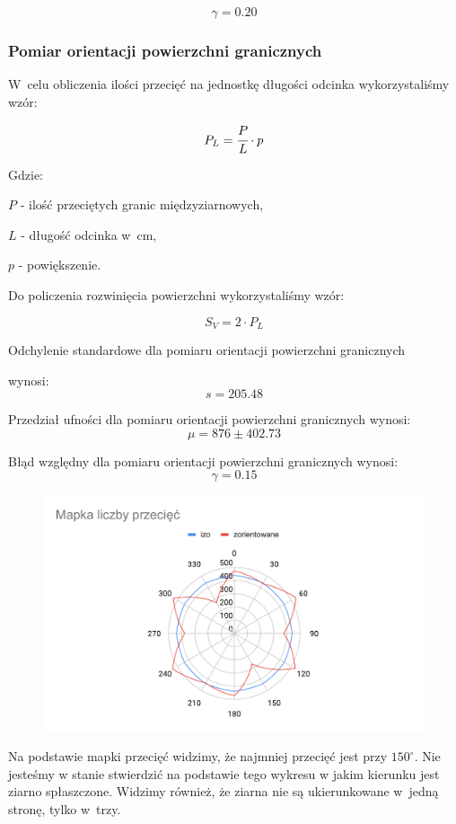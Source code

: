 \documentclass[a4paper,12pt]{article}
\begin{document}
$$\gamma=0.20$$

\subsubsection{Pomiar orientacji powierzchni granicznych}

W~celu obliczenia ilości przecięć na jednostkę długości odcinka wykorzystaliśmy wzór:

$$P_L=\cfrac{P}{L} \cdot p$$

Gdzie:

$P$ - ilość przeciętych granic międzyziarnowych,

$L$ - długość odcinka w~cm,

$p$ - powiększenie.
\newline

Do policzenia rozwinięcia powierzchni wykorzystaliśmy wzór:

$$S_V= 2\cdot P_L$$



Odchylenie standardowe dla pomiaru orientacji powierzchni granicznych 

wynosi:
$$s=205.48$$

Przedział ufności dla pomiaru orientacji powierzchni granicznych wynosi:
$$\mu = 876\pm 402.73$$

Błąd względny dla pomiaru orientacji powierzchni granicznych wynosi:
$$\gamma = 0.15$$
\newline

\begin{figure}[H]
    \centering
    \includegraphics[width=\textwidth]{img/Mapka liczby przecięć.pdf}
\end{figure}

{\color{purple}
Na podstawie mapki przecięć widzimy, że najmniej przecięć jest przy $150^{\circ}$. Nie jesteśmy w stanie stwierdzić na podstawie tego wykresu w jakim kierunku jest ziarno spłaszczone. Widzimy również, że ziarna nie są ukierunkowane w~jedną stronę, tylko w~trzy. 
}
\end{document}
